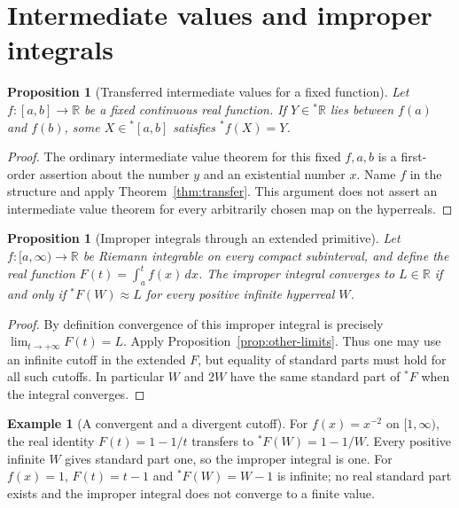 \documentclass[11pt]{article}
\newtheorem{proposition}[theorem]{Proposition}
\theoremstyle{definition}
\newtheorem{example}[theorem]{Example}
\theoremstyle{remark}
\newcommand{\RR}{\mathbb R}
\newcommand{\HR}{{}^{*}\mathbb R}
\newcommand{\ext}[1]{{}^{*}\!#1}
\begin{document}
\section{Intermediate values and improper integrals}
\begin{proposition}[Transferred intermediate values for a fixed function]\label{prop:ivt}
Let \(f:[a,b]\to\RR\) be a fixed continuous real function. If \(Y\in\HR\)
lies between \(f(a)\) and \(f(b)\), some \(X\in\ext{[a,b]}\) satisfies
\(\ext f(X)=Y\).
\end{proposition}
\begin{proof}
The ordinary intermediate value theorem for this fixed \(f,a,b\) is a
first-order assertion about the number \(y\) and an existential number \(x\).
Name \(f\) in the structure and apply Theorem~\ref{thm:transfer}.
This argument does not assert an intermediate value theorem for every
arbitrarily chosen map on the hyperreals.
\end{proof}
\begin{proposition}[Improper integrals through an extended primitive]\label{prop:improper}
Let \(f:[a,\infty)\to\RR\) be Riemann integrable on every compact subinterval,
and define the real function \(F(t)=\int_a^t f(x)\,dx\).
The improper integral converges to \(L\in\RR\) if and only if
\(\ext F(W)\approx L\) for every positive infinite hyperreal \(W\).
\end{proposition}
\begin{proof}
By definition convergence of this improper integral is precisely
\(\lim_{t\to+\infty}F(t)=L\). Apply Proposition~\ref{prop:other-limits}.
Thus one may use an infinite cutoff in the extended \(F\), but equality of
standard parts must hold for all such cutoffs. In particular \(W\) and \(2W\)
have the same standard part of \(\ext F\) when the integral converges.
\end{proof}
\begin{example}[A convergent and a divergent cutoff]\label{ex:integrals}
For \(f(x)=x^{-2}\) on \([1,\infty)\), the real identity \(F(t)=1-1/t\)
transfers to \(\ext F(W)=1-1/W\). Every positive infinite \(W\) gives
standard part one, so the improper integral is one.
For \(f(x)=1\), \(F(t)=t-1\) and \(\ext F(W)=W-1\) is infinite; no real
standard part exists and the improper integral does not converge to a finite value.
\end{example}
\end{document}

